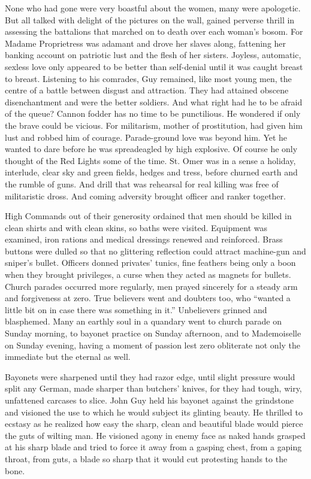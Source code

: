 None who had gone were very boastful about the women, many were apologetic. But all talked with delight of the pictures on the wall, gained perverse thrill in assessing the battalions that marched on to death over each woman's bosom. For Madame Proprietress was adamant and drove her slaves along, fattening her banking account on patriotic lust and the flesh of her sisters. Joyless, automatic, sexless love only appeared to be better than self-denial until it was caught breast to breast. Listening to his comrades, Guy remained, like most young men, the centre of a battle between disgust and attraction. They had attained obscene disenchantment and were the better soldiers. And what right had he to be afraid of the queue? Cannon fodder has no time to be punctilious. He wondered if only the brave could be vicious. For militarism, mother of prostitution, had given him lust and robbed him of courage. Parade-ground love was beyond him. Yet he wanted to dare before he was spreadeagled by high explosive. Of course he only thought of the Red Lights some of the time. St. Omer was in a sense a holiday, interlude, clear sky and green fields, hedges and tress, before churned earth and the rumble of guns. And drill that was rehearsal for real killing was free of militaristic dross. And coming adversity brought officer and ranker together.

High Commands out of their generosity ordained that men should be killed in clean shirts and with clean skins, so baths were visited. Equipment was examined, iron rations and medical dressings renewed and reinforced. Brass buttons were dulled so that no glittering reflection could attract machine-gun and sniper's bullet. Officers donned privates' tunics, fine feathers being only a boon when they brought privileges, a curse when they acted as magnets for bullets. Church parades occurred more regularly, men prayed sincerely for a steady arm and forgiveness at zero. True believers went and doubters too, who ``wanted a little bit on in case there was something in it.'' Unbelievers grinned and blasphemed. Many an earthly soul in a quandary went to church parade on Sunday morning, to bayonet practice on Sunday afternoon, and to Mademoiselle on Sunday evening, having a moment of passion lest zero obliterate not only the immediate but the eternal as well.

Bayonets were sharpened until they had razor edge, until slight pressure would split any German, made sharper than butchers' knives, for they had tough, wiry, unfattened carcases to slice. John Guy held his bayonet against the grindstone and visioned the use to which he would subject its glinting beauty. He thrilled to ecstasy as he realized how easy the sharp, clean and beautiful blade would pierce the guts of wilting man. He visioned agony in enemy face as naked hands grasped at his sharp blade and tried to force it away from a gasping chest, from a gaping throat, from guts, a blade so sharp that it would cut protesting hands to the bone.

